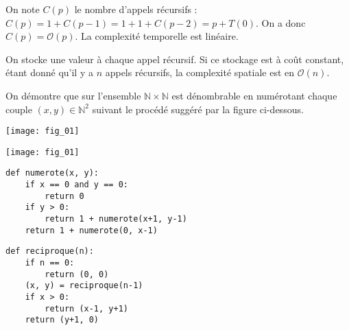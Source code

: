 \ifprof
\begin{corrige}
On note $C(p)$ le nombre d'appels récursifs : $C(p) = 1+C(p-1) = 1+1+C(p-2)=p+T(0)$. On a donc $C(p)=\mathcal{O}(p)$. La 
complexité temporelle est linéaire.
\end{corrige}
\else
\fi

\ifprof
\begin{corrige}
On stocke une valeur à chaque appel récursif. Si ce stockage est à coût constant, étant donné qu'il y a $n$ appels 
récursifs, la complexité spatiale est en $\mathcal{O}(n)$.
\end{corrige}
\else
\fi


\setcounter{question}{0}

On démontre que sur l'ensemble $\mathbb{N}\times \mathbb{N}$ est dénombrable en numérotant chaque couple $(x,y)\in\mathbb{N}^2$ suivant le procédé suggéré par la figure ci-dessous.
\ifprof
\begin{center}
\texttt{[image: fig\_01]}
\end{center}
\else
\begin{marginfigure}
\texttt{[image: fig\_01]}
\end{marginfigure}
\fi

\ifprof
\begin{corrige}
\begin{lstlisting}
def numerote(x, y):
    if x == 0 and y == 0:
        return 0
    if y > 0:
        return 1 + numerote(x+1, y-1)
    return 1 + numerote(0, x-1)
\end{lstlisting}
\end{corrige}
\else
\fi

\ifprof
\begin{corrige}
\begin{lstlisting}
def reciproque(n):
    if n == 0:
        return (0, 0)
    (x, y) = reciproque(n-1)
    if x > 0:
        return (x-1, y+1)
    return (y+1, 0)
\end{lstlisting}
\end{corrige}
\else
\fi




\setcounter{question}{0}


